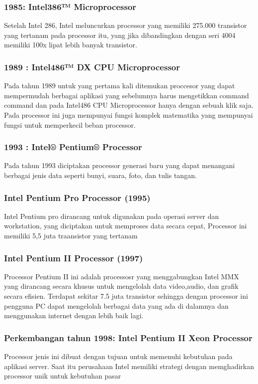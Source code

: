  			\subsubsection{1985: Intel386™ Microprocessor}
 	Setelah Intel 286, Intel meluncurkan processor yang memiliki 275.000 transistor yang tertanam pada processor itu, yang jika dibandingkan dengan seri 4004 memiliki 100x lipat lebih banyak transistor.

 			\subsubsection{1989 : Intel486™ DX CPU Microprocessor}
 	Pada tahun 1989 untuk yang pertama kali  ditemukan proccesor yang dapat mempermudah berbagai aplikasi yang sebelumnya harus mengetikkan command command dan pada Intel486 CPU Microprocessor hanya dengan sebuah klik saja. Pada processor ini juga mempunyai fungsi komplek matematika yang mempunyai fungsi untuk memperkecil beban processor.
 			\subsubsection {1993 : Intel® Pentium® Processor}
 	Pada tahun 1993 diciptakan processor generasi baru yang dapat menangani berbagai jenis data seperti bunyi, suara, foto, dan tulis tangan.


 			\subsubsection{Intel Pentium Pro Processor (1995)}
 	Intel Pentium pro dirancang untuk digunakan pada operasi server dan workstation, yang diciptakan untuk memproses data secara cepat, Processor ini memiliki 5,5 juta traansistor yang tertanam
 			\subsubsection{Intel Pentium II Processor (1997)}	
 	Processor Pentium II ini adalah processosr yang menggabungkan Intel MMX yang dirancang secara khusus untuk mengelolah data video,audio, dan grafik secara efisien. Terdapat sekitar 7.5 juta transistor sehingga dengan processor ini pengguna PC dapat mengelolah berbagai data yang ada di dalamnya dan menggunakan internet dengan lebih baik lagi.


 			\subsubsection{Perkembangan tahun 1998: Intel Pentium II Xeon Processor}
 	Processor jenis ini dibuat dengan tujuan untuk memenuhi kebutuhan pada aplikasi server. Saat itu perusahaan Intel memiliki strategi dengan memghadirkan processor unik untuk kebutuhan pasar
